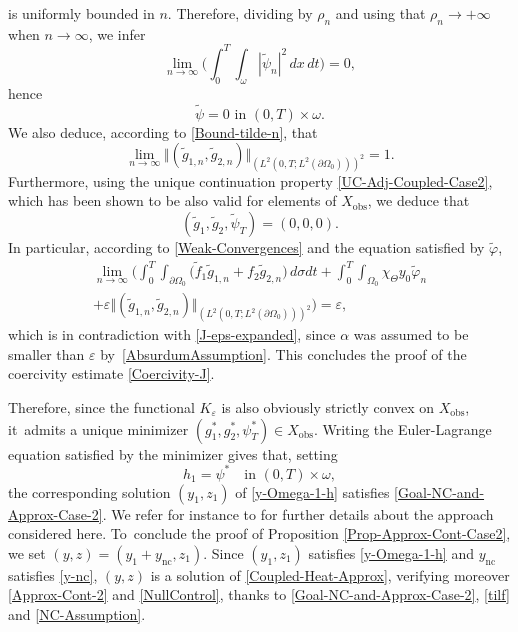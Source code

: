 \documentclass[10pt,a4paper]{amsart}
\newcommand{\nc}{\mathrm{nc}}
\newcommand{\obs}{\mathrm{obs}}
\newcommand{\norm}[1]{\Vert#1\Vert}
\theoremstyle{definition}
\begin{document}
is uniformly bounded in $n$. Therefore, dividing by $\rho_n$ and using that $\rho_n\to +\infty$ when $n\to \infty$, we infer
\begin{equation*}
\lim_{n \to \infty} \biggl(\int_0^T \int_\omega |\tilde \psi_n|^2 \, dx\,dt \biggr) = 0,
\end{equation*}
hence
\[
\tilde \psi = 0 \text{ in } (0,T) \times \omega.
\]
We also deduce, according to \eqref{Bound-tilde-n}, that
\begin{equation*}
\lim_{n \to \infty} \norm{(\tilde g_{1,n}, \tilde g_{2,n})}_{(L^2(0,T; L^2(\partial\Omega_0)))^2} = 1.
\end{equation*}
Furthermore, using the unique continuation property \eqref{UC-Adj-Coupled-Case2}, which has been shown to be also valid for elements of $X_{\obs}$, we deduce that
\[
(\tilde g_1, \tilde g_2, \tilde \psi_T) = (0,0,0).
\]
In particular, according to \eqref{Weak-Convergences} and the equation satisfied by $\tilde \varphi$,
\begin{multline*}
\lim_{n \to \infty}
\biggl(
\int_0^T \int_{\partial \Omega_0} \bigl(\tilde f_1 \tilde g_{1,n} + f_2 \tilde g_{2,n} \bigr) \, d\sigma dt
+
\int_0^T \int_{\Omega_0} \chi_{\Theta} y_0 \tilde \varphi_n\\[-5pt]
+
\varepsilon
{ \norm{(\tilde g_{1,n}, \tilde g_{2,n})}_{(L^2(0,T; L^2(\partial\Omega_0)))^2}}
\biggr)
=
\varepsilon,
\end{multline*}
which is in contradiction with \eqref{J-eps-expanded}{, since $\alpha$ was assumed to be smaller than $\varepsilon$ by~\eqref{AbsurdumAssumption}}. This concludes the proof of the coercivity estimate \eqref{Coercivity-J}.

Therefore, since the functional $K_\varepsilon$ is also obviously strictly convex on $X_{\obs}$, it~admits a unique minimizer $(g_1^*, g_2^*, \psi_T^*) \in X_{\obs}$. Writing the Euler-Lagrange equation satisfied by the minimizer gives that, setting
\begin{equation*}
h_1 = \psi^* \quad\text{in } (0,T) \times \omega,
\end{equation*}
the corresponding solution $(y_1,z_1)$ of \eqref{y-Omega-1-h} satisfies \eqref{Goal-NC-and-Approx-Case-2}. We refer for instance to \cite[Th.\,1.2 and its proof]{Ervedoza-Note-2020} for further details about the approach considered here. To~conclude the proof of Proposition \ref{Prop-Approx-Cont-Case2}, we set $(y,z)=(y_1+y_{\nc},z_1)$. Since $(y_1,z_1)$ satisfies \eqref{y-Omega-1-h} and $y_{\nc}$ satisfies \eqref{y-nc}, $(y,z)$ is a solution of \eqref{Coupled-Heat-Approx}, verifying moreover \eqref{Approx-Cont-2} and \eqref{NullControl}, thanks to \eqref{Goal-NC-and-Approx-Case-2}, \eqref{tilf} and \eqref{NC-Assumption}.
\end{document}
